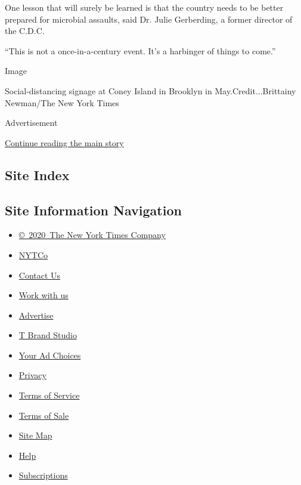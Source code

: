 One lesson that will surely be learned is that the country needs to be
better prepared for microbial assaults, said Dr. Julie Gerberding, a
former director of the C.D.C.

``This is not a once-in-a-century event. It's a harbinger of things to
come.''

Image

Social-distancing signage at Coney Island in Brooklyn in
May.Credit...Brittainy Newman/The New York Times

Advertisement

\protect\hyperlink{after-bottom}{Continue reading the main story}

\hypertarget{site-index}{%
\subsection{Site Index}\label{site-index}}

\hypertarget{site-information-navigation}{%
\subsection{Site Information
Navigation}\label{site-information-navigation}}

\begin{itemize}
\tightlist
\item
  \href{https://help.nytimes3xbfgragh.onion/hc/en-us/articles/115014792127-Copyright-notice}{©~2020~The
  New York Times Company}
\end{itemize}

\begin{itemize}
\tightlist
\item
  \href{https://www.nytco.com/}{NYTCo}
\item
  \href{https://help.nytimes3xbfgragh.onion/hc/en-us/articles/115015385887-Contact-Us}{Contact
  Us}
\item
  \href{https://www.nytco.com/careers/}{Work with us}
\item
  \href{https://nytmediakit.com/}{Advertise}
\item
  \href{http://www.tbrandstudio.com/}{T Brand Studio}
\item
  \href{https://www.nytimes3xbfgragh.onion/privacy/cookie-policy\#how-do-i-manage-trackers}{Your
  Ad Choices}
\item
  \href{https://www.nytimes3xbfgragh.onion/privacy}{Privacy}
\item
  \href{https://help.nytimes3xbfgragh.onion/hc/en-us/articles/115014893428-Terms-of-service}{Terms
  of Service}
\item
  \href{https://help.nytimes3xbfgragh.onion/hc/en-us/articles/115014893968-Terms-of-sale}{Terms
  of Sale}
\item
  \href{https://spiderbites.nytimes3xbfgragh.onion}{Site Map}
\item
  \href{https://help.nytimes3xbfgragh.onion/hc/en-us}{Help}
\item
  \href{https://www.nytimes3xbfgragh.onion/subscription?campaignId=37WXW}{Subscriptions}
\end{itemize}
